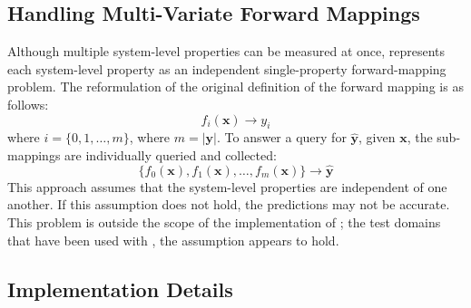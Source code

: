 \subsection{Handling Multi-Variate Forward Mappings}

Although multiple system-level properties can be measured at once,
\fw represents each system-level property as an independent single-property forward-mapping problem.
The reformulation of the original definition of the forward mapping is as follows:
\[ f_i(\mathbf x) \rightarrow y_i \]
where $i = \{0, 1, \ldots, m\}$, where $m = |\mathbf y|$.
To answer a  query for $\hat{\mathbf y}$, given $\mathbf x$, the sub-mappings are individually queried and collected:
\[ \{f_0(\mathbf x), f_1(\mathbf x), \ldots, f_{m}(\mathbf x)\} \rightarrow \hat{\mathbf y} \]
This approach assumes that the system-level properties are independent of one another.
If this assumption does not hold, the predictions may not be accurate.
This problem is outside the scope of the implementation of \fw; the test domains that have been used with \fw, the assumption appears to hold.




\subsection{Implementation Details}

